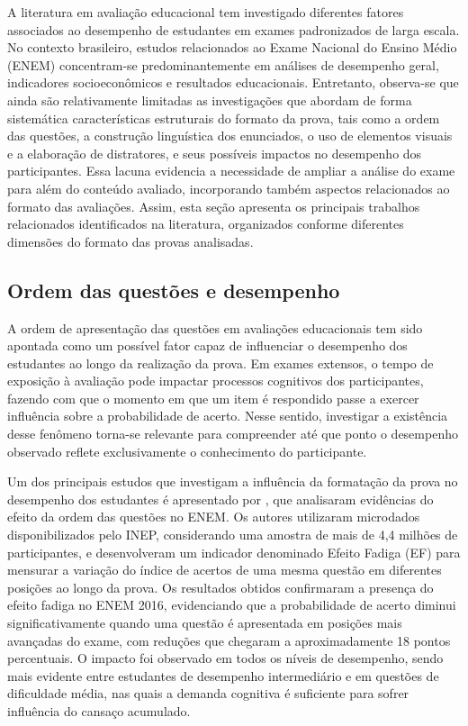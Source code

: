 \documentclass[a4paper,10pt, twocolumn]{article}
\begin{document}
A literatura em avaliação educacional tem investigado diferentes fatores associados ao desempenho de estudantes em exames padronizados de larga escala. No contexto brasileiro, estudos relacionados ao Exame Nacional do Ensino Médio (ENEM) concentram-se predominantemente em análises de desempenho geral, indicadores socioeconômicos e resultados educacionais. Entretanto, observa-se que ainda são relativamente limitadas as investigações que abordam de forma sistemática características estruturais do formato da prova, tais como a ordem das questões, a construção linguística dos enunciados, o uso de elementos visuais e a elaboração de distratores, e seus possíveis impactos no desempenho dos participantes. Essa lacuna evidencia a necessidade de ampliar a análise do exame para além do conteúdo avaliado, incorporando também aspectos relacionados ao formato das avaliações. Assim, esta seção apresenta os principais trabalhos relacionados identificados na literatura, organizados conforme diferentes dimensões do formato das provas analisadas.

\subsection{Ordem das questões e desempenho}

A ordem de apresentação das questões em avaliações educacionais tem sido apontada como um possível fator capaz de influenciar o desempenho dos estudantes ao longo da realização da prova. Em exames extensos, o tempo de exposição à avaliação pode impactar processos cognitivos dos participantes, fazendo com que o momento em que um item é respondido passe a exercer influência sobre a probabilidade de acerto. Nesse sentido, investigar a existência desse fenômeno torna-se relevante para compreender até que ponto o desempenho observado reflete exclusivamente o conhecimento do participante.

Um dos principais estudos que investigam a influência da formatação da prova no desempenho dos estudantes é apresentado por \textcite{Barichello2022}, que analisaram evidências do efeito da ordem das questões no ENEM. Os autores utilizaram microdados disponibilizados pelo INEP, considerando uma amostra de mais de 4,4 milhões de participantes, e desenvolveram um indicador denominado Efeito Fadiga (EF) para mensurar a variação do índice de acertos de uma mesma questão em diferentes posições ao longo da prova. Os resultados obtidos confirmaram a presença do efeito fadiga no ENEM 2016, evidenciando que a probabilidade de acerto diminui significativamente quando uma questão é apresentada em posições mais avançadas do exame, com reduções que chegaram a aproximadamente 18 pontos percentuais. O impacto foi observado em todos os níveis de desempenho, sendo mais evidente entre estudantes de desempenho intermediário e em questões de dificuldade média, nas quais a demanda cognitiva é suficiente para sofrer influência do cansaço acumulado. 
\end{document}
